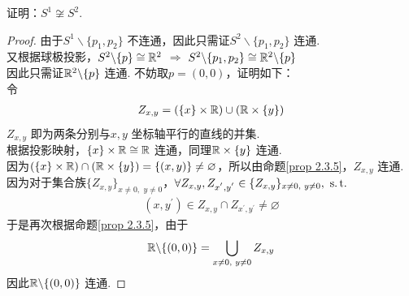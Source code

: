 	\vspace*{2em}
	\begin{example}\label{ex 2.3.3}
		证明：$S^1 \not\cong S^2$.
		
		\vspace*{2em}
		\begin{proof}
			由于$S^1 \backslash \{ p_1 , p_2 \}$ 不连通，因此只需证$S^2 \backslash \{ p_1 , p_2 \}$ 连通.\\
			又根据球极投影，$S^2 \backslash \{ p \} \cong \mathbb{R}^2$ $\Rightarrow$ $S^2 \backslash \{ p_1 , p_2 \} \cong \mathbb{R}^2 \backslash \{ p \}$\\
			因此只需证$\mathbb{R}^2 \backslash \{ p \}$ 连通. 不妨取$p = (0 , 0)$，证明如下：\\
			令
			\begin{align}
				Z_{x , y} = (\{ x \} \times \mathbb{R}) \cup (\mathbb{R} \times \{ y \})
			\end{align}
			$Z_{x , y}$ 即为两条分别与$x , y$ 坐标轴平行的直线的并集.\\
			根据投影映射，$\{ x \} \times \mathbb{R} \cong \mathbb{R}$ 连通，同理$\mathbb{R} \times \{ y \}$ 连通.\\
			因为$( \{ x \} \times \mathbb{R} ) \cap ( \mathbb{R} \times \{ y \} ) = \{ (x , y) \} \neq \varnothing$，所以由命题\ref{prop 2.3.5}，$Z_{x , y}$ 连通.\\
			因为对于集合族$\{ Z_{x , y} \}_{x \neq 0 , \,\, y \neq 0}$，$\forall Z_{x , y} , Z_{x^{'} , y^{'}} \in \{ Z_{x , y} \}_{x \neq 0 , \,\, y \neq 0} , \,\, \operatorname{s.t.}$
			\begin{align}
				(x , y^{'}) \in Z_{x , y} \cap Z_{x^{'} , y^{'}} \neq \varnothing
			\end{align}
			于是再次根据命题\ref{prop 2.3.5}，由于
			\begin{align}
				\mathbb{R} \backslash \{ (0 , 0) \} = \bigcup_{x \neq 0 , \,\, y \neq 0}{Z_{x , y}}
			\end{align}
			因此$\mathbb{R} \backslash \{ (0 , 0) \}$ 连通.
		\end{proof}
	\end{example}
	
